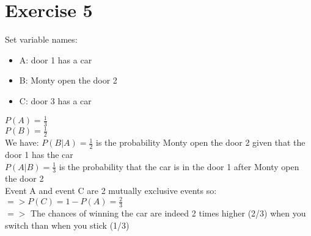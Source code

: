 \documentclass{article}
\begin{document}
\section{Exercise 5}
Set variable names:
\begin{itemize}
    \item A: door 1 has a car
    \item B: Monty open the door 2
    \item C: door 3 has a car
\end{itemize}
$P(A) = \frac{1}{3}$\\
$P(B) = \frac{1}{2}$\\
We have: $P(B|A) = \frac{1}{2}$ is the probability Monty open the door 2 given that the door 1 has the car\\
$P(A|B) = \frac{1}{3}$ is the probability that the car is in the door 1 after Monty open the door 2\\
Event A and event C are 2 mutually exclusive events so:\\
$=> P(C) = 1 - P(A) = \frac{2}{3}$\\
$=>$ The chances of winning the car are indeed 2 times higher (2/3) when you switch than when you stick (1/3)
\end{document}
